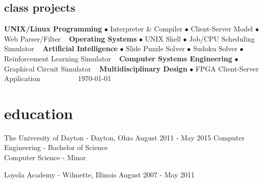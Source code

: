 \documentclass[print]{resume}
\begin{document}
\begin{aside}
\section{class projects} 
\textbf{UNIX/Linux Programming}
$\bullet$ Interpreter \& Compiler
$\bullet$ Client-Server Model
$\bullet$ Web Parser/Filter
~
\textbf{Operating Systems}
$\bullet$ UNIX Shell
$\bullet$ Job/CPU Scheduling Simulator
~
\textbf{Artificial Intelligence}
$\bullet$ Slide Puzzle Solver
$\bullet$ Sudoku Solver 
$\bullet$ Reinforcement Learning Simulator
~
\textbf{Computer Systems Engineering}
$\bullet$ Graphical Circuit Simulator
~
\textbf{Multidisciplinary Design}
$\bullet$ FPGA Client-Server Application
~
~
~
~
~
~
\today
\end{aside}

\section{education}
\begin{entrylist}

\entry
{}
{The University of Dayton \thinfont\footnotesize{}- Dayton, Ohio}
{August 2011 - May 2015}		
{Computer Engineering - Bachelor of Science\\Computer Science - Minor}

\entry
{}
{Loyola Academy \thinfont\footnotesize{}- Wilmette, Illinois}
{August 2007 - May 2011}
{}

\end{entrylist}
\end{document}
